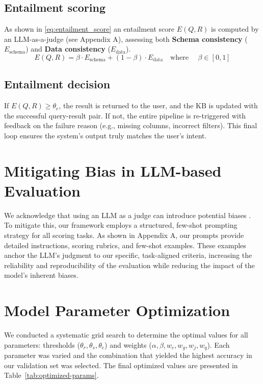 \documentclass[runningheads]{llncs}
\begin{document}
\subsection{Entailment scoring}
As shown in \ref{eq:entailment_score} an entailment score $E(Q, R)$ is computed by an LLM-as-a-judge (see Appendix A), assessing both \textbf{Schema consistency} ($E_{\text{schema}}$) and \textbf{Data consistency} ($E_{\text{data}}$).
\begin{equation} \label{eq:entailment_score}
E(Q, R) = \beta \cdot E_{\text{schema}} + (1 - \beta) \cdot E_{\text{data}} \quad \text{where } \quad \beta \in [0,1]
\end{equation}

\subsection{Entailment decision}
If $E(Q, R) \geq \theta_e$, the result is returned to the user, and the KB is updated with the successful query-result pair. If not, the entire pipeline is re-triggered with feedback on the failure reason (e.g., missing columns, incorrect filters). This final loop ensures the system's output truly matches the user's intent.

\section{Mitigating Bias in LLM-based Evaluation}
We acknowledge that using an LLM as a judge can introduce potential biases \cite{zheng2023judging}. To mitigate this, our framework employs a structured, few-shot prompting strategy for all scoring tasks. As shown in Appendix A, our prompts provide detailed instructions, scoring rubrics, and few-shot examples. These examples anchor the LLM's judgment to our specific, task-aligned criteria, increasing the reliability and reproducibility of the evaluation while reducing the impact of the model's inherent biases.

\section{Model Parameter Optimization}
\label{sec:parameters}
We conducted a systematic grid search to determine the optimal values for all parameters: thresholds ($\theta_r, \theta_s, \theta_e$) and weights ($\alpha, \beta, w_c, w_g, w_j, w_q$). Each parameter was varied and the combination that yielded the highest accuracy in our validation set was selected. The final optimized values are presented in Table~\ref{tab:optimized-params}.
\end{document}

